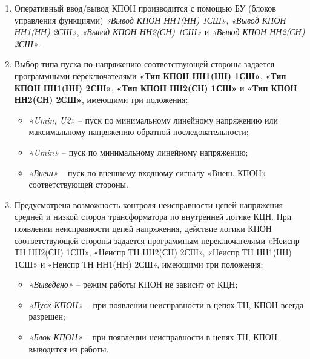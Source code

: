 \begin{enumerate}[label=\arabic{section}.\arabic{subsection}.\arabic*,  align=left, labelsep=4pt, leftmargin=0pt, itemindent=57pt]
\item
Оперативный ввод/вывод КПОН производится с помощью БУ (блоков управления функциями) \textit{«Вывод КПОН НН1(НН) 1СШ»}, \textit{«Вывод КПОН НН1(НН) 2СШ»}, \textit{«Вывод КПОН НН2(СН) 1СШ»} и \textit{«Вывод КПОН НН2(СН) 2СШ»}.

\item
Выбор типа пуска по напряжению соответствующей стороны задается программными переключателями \textbf{«Тип КПОН НН1(НН) 1СШ»}, \textbf{«Тип КПОН НН1(НН) 2СШ»}, \textbf{«Тип КПОН НН2(СН) 1СШ»} и \textbf{«Тип КПОН НН2(СН) 2СШ»}, имеющими три положения:
\begin{itemize}
\item \textit{«Umin, U2»} -- пуск по минимальному линейному напряжению или максимальному напряжению обратной последовательности;
\item \textit{«Umin»} -- пуск по минимальному линейному напряжению;
\item \textit{«Внеш»} -- пуск по внешнему входному сигналу «Внеш. КПОН» соответствующей стороны. 
\end{itemize}

\item
Предусмотрена возможность контроля неисправности цепей напряжения средней и низкой сторон трансформатора по внутренней логике КЦН. При появлении неисправности цепей напряжения, действие логики КПОН соответствующей стороны задается программным переключателями «Неиспр ТН НН2(СН) 1СШ», «Неиспр ТН НН2(СН) 2СШ», «Неиспр ТН НН1(НН) 1СШ» и «Неиспр ТН НН1(НН) 2СШ», имеющими три положения:
\begin{itemize}
\item \textit{«Выведено»} -- режим работы КПОН не зависит от КЦН;
\item \textit{«Пуск КПОН»} -- при появлении неисправности в цепях ТН, КПОН всегда разрешен;
\item \textit{«Блок КПОН»} -- при появлении неисправности в цепях ТН, КПОН выводится из работы. 
\end{itemize}












































\end{enumerate} 